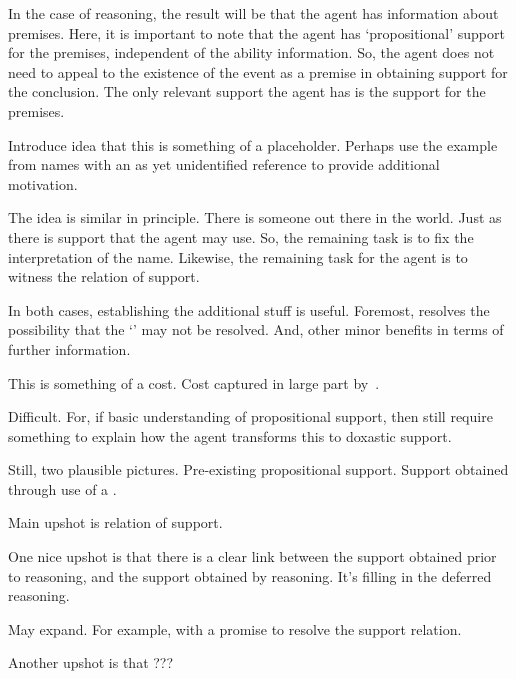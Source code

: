 \begin{note}
  In the case of reasoning, the result will be that the agent has information about premises.
  Here, it is important to note that the agent has `propositional' support for the premises, independent of the ability information.
  So, the agent does not need to appeal to the existence of the event as a premise in obtaining support for the conclusion.
  The only relevant support the agent has is the support for the premises.
\end{note}

\begin{note}
  Introduce idea that this is something of a placeholder.
  Perhaps use the example from names with an as yet unidentified reference to provide additional motivation.

  The idea is similar in principle.
  There is someone out there in the world.
  Just as there is support that the agent may use.
  So, the remaining task is to fix the interpretation of the name.
  Likewise, the remaining task for the agent is to witness the relation of support.

  In both cases, establishing the additional stuff is useful.
  Foremost, resolves the possibility that the `\future{}' may not be resolved.
  And, other minor benefits in terms of further information.
\end{note}

\begin{note}
  This is something of a cost.
  Cost captured in large part by~\ESU{}.

  Difficult.
  For, if basic understanding of propositional support, then still require something to explain how the agent transforms this to doxastic support.

  Still, two plausible pictures.
  Pre-existing propositional support.
  Support obtained through use of a \future{}.
\end{note}

\begin{note}[Upshot]
  Main upshot is relation of support.

  One nice upshot is that there is a clear link between the support obtained prior to reasoning, and the support obtained by reasoning.
  It's filling in the deferred reasoning.

  May expand.
  For example, with a promise to resolve the support relation.

  Another upshot is that ???
\end{note}


